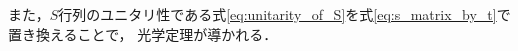 \documentclass[a4paper,11pt]{ltjsarticle}
\begin{document}
また，$S$行列のユニタリ性である式\ref{eq:unitarity_of_S}を式\ref{eq:s_matrix_by_t}で置き換えることで，
光学定理が導かれる．




























\newpage
% 
% 
\printbibliography%
\end{document}
